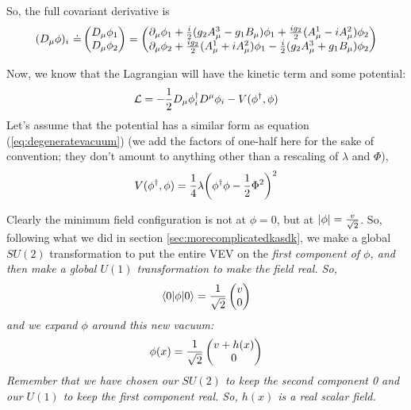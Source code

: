 \documentclass[12pt,epsf]{article}
\begin{document}
So, the full covariant derivative is
\begin{eqnarray}
(D_{\mu}\phi)_i~ \dot{=} \begin{pmatrix} D_{\mu}\phi_1 \\ D_{\mu}\phi_2
\end{pmatrix} = 
\begin{pmatrix}
\partial_{\mu}\phi_1 + {i\over 2}(g_2A^3_{\mu} - g_1B_{\mu})\phi_1 +
{ig_2\over 2}(A^1_{\mu} - i A^2_{\mu})\phi_2 \\
\partial_{\mu}\phi_2 + {ig_2 \over 2}(A^1_{\mu} + i A^2_{\mu})\phi_1 -
{i \over 2} (g_2 A^3_{\mu}+ g_1 B_{\mu})\phi_2
\end{pmatrix} \label{eq:higgscovder}
\end{eqnarray}

Now, we know that the Lagrangian will have the kinetic term and some
potential:
\begin{eqnarray}
\mathcal{L} = -{1\over 2} D_{\mu}\phi^{\dagger}_i D^{\mu}\phi_i -
V(\phi^{\dagger},\phi) \label{eq:higgslag}
\end{eqnarray}
Let's assume that the potential has a similar form as equation
(\ref{eq:degeneratevacuum}) (we add the factors of one-half here for
the sake of convention; they don't amount to anything other than a
rescaling of $\lambda$ and $\Phi$),
\begin{eqnarray}
V(\phi^{\dagger},\phi) = {1\over 4}\lambda \bigg(\phi^{\dagger}\phi -
{1\over 2} \Phi^2\bigg)^2 \label{eq:potentialupthere}
\end{eqnarray}

Clearly the minimum field configuration is not at $\phi=0$, but at
$|\phi| = {v \over \sqrt{2}}$.	So, following what we did in section
\ref{sec:morecomplicatedkasdk}, we make a global $SU(2)$ transformation
to put the entire VEV on the \it first \rm component of $\phi$, and
then make a global $U(1)$ transformation to make the field real.  So,
\begin{eqnarray}
\langle 0 |\phi|0 \rangle = {1\over \sqrt{2}}
\begin{pmatrix}
v \\ 0
\end{pmatrix}
\end{eqnarray}
and we expand $\phi$ around this new vacuum:
\begin{eqnarray}
\phi(x) = {1\over \sqrt{2}}
\begin{pmatrix}
v+ h(x) \\ 0
\end{pmatrix} \label{eq:asdjfahs}
\end{eqnarray}
Remember that we have chosen our $SU(2)$ to keep the second component
0 and our $U(1)$ to keep the first component real.  So, $h(x)$ is a
real scalar field.  
\end{document}
